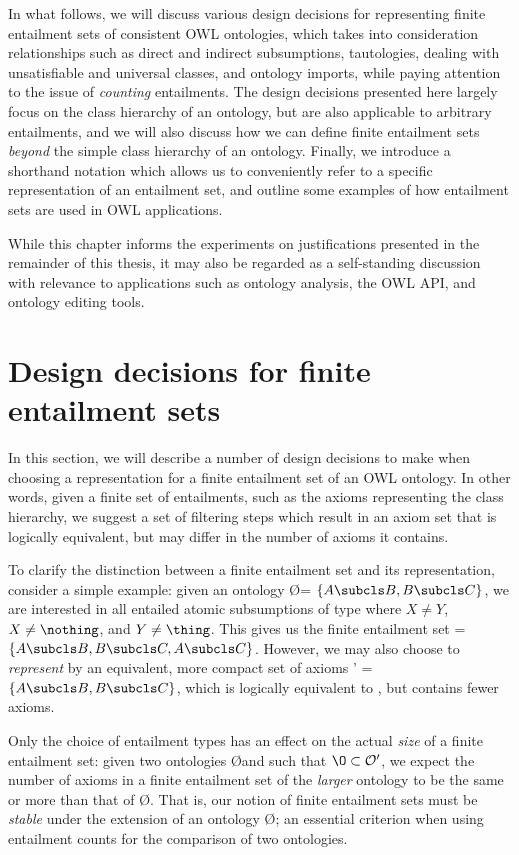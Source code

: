 In what follows, we will discuss various design decisions for representing finite entailment sets  of consistent OWL ontologies, which takes into consideration relationships such as direct and indirect subsumptions, tautologies, dealing with unsatisfiable and universal classes, and ontology imports, while paying attention to the issue of \emph{counting} entailments. The design decisions presented here largely focus on the class hierarchy of an ontology, but are also applicable to arbitrary entailments, and we will also discuss how we can define finite entailment sets \emph{beyond} the simple class hierarchy of an ontology. Finally, we introduce a shorthand notation which allows us to conveniently refer to a specific representation of an entailment set, and outline some examples of how entailment sets are used in OWL applications. 

While this chapter informs the experiments on justifications presented in the remainder of this thesis, it may also be regarded as a self-standing discussion with relevance to applications such as ontology analysis, the OWL API, and ontology editing tools.


\section{Design decisions for finite entailment sets}

In this section, we will describe a number of design decisions to make when choosing a representation for a finite entailment set of an OWL ontology. In other words, given a finite set of entailments, such as the axioms representing the class hierarchy, we suggest a set of filtering steps which result in an axiom set that is logically equivalent, but may differ in the number of axioms it contains.

To clarify the distinction between a finite entailment set and its representation, consider a simple example: given an ontology \O = $\{A \subcls B, B \subcls C\}$, we are interested in all entailed atomic subsumptions of type  where $X \not= Y$, $X \not= \nothing$, and $Y \not= \thing$. This gives us the finite entailment set \entset = $\{A \subcls B, B \subcls C, A \subcls C\}$. However, we may also choose to \emph{represent} \entset by an equivalent, more compact set of axioms \entset' = $\{A \subcls B, B \subcls C\}$, which is logically equivalent to \entset, but contains fewer axioms. 

Only the choice of entailment types has an effect on the actual \emph{size} of a finite entailment set: given two ontologies \O and \oprime such that $\O \subset \oprime$, we expect the number of axioms in a finite entailment set of the \emph{larger} ontology \oprime to be the same or more than that of \O. That is, our notion of finite entailment sets must be \emph{stable} under the extension of an ontology \O; an essential criterion when using entailment counts for the comparison of two ontologies. 

